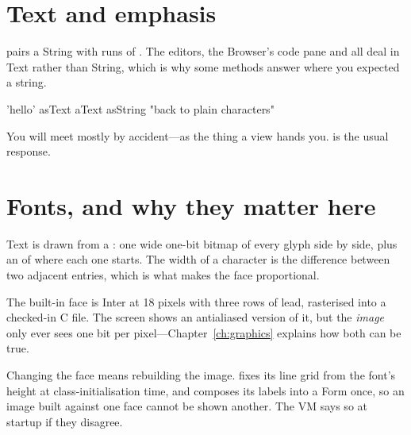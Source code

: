 \section{Text and emphasis}

 pairs a String with runs of . The editors,
the Browser's code pane and  all deal in Text rather than
String, which is why some methods answer  where you expected a
string.

\begin{st}
'hello' asText
aText asString                   "back to plain characters"
\end{st}

You will meet  mostly by accident---as the thing a view hands you.
 is the usual response.

\section{Fonts, and why they matter here}

Text is drawn from a : one wide one-bit bitmap of every glyph
side by side, plus an  of where each one starts. The width of a
character is the difference between two adjacent entries, which is what makes
the face proportional.

The built-in face is Inter at 18 pixels with three rows of lead, rasterised
into a checked-in C file. The screen shows an antialiased version of it, but
the \emph{image} only ever sees one bit per pixel---Chapter~\ref{ch:graphics}
explains how both can be true.

\begin{stwarn}
Changing the face means rebuilding the image.  fixes its line
grid from the font's height at class-initialisation time, and 
composes its labels into a Form once, so an image built against one face
cannot be shown another. The VM says so at startup if they disagree.
\end{stwarn}
